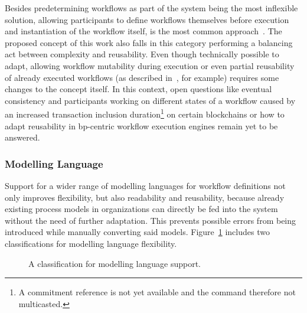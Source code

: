 Besides predetermining workflows as part of the system being the most inflexible solution, allowing participants to define workflows themselves before execution and instantiation of the workflow itself, is the most common approach~\cite{untrusted_bp_execution_using_blockchain,bo_collaboration_between_healthcare_providers_covid_19,lean_architecture_for_blockchain_based_process_execution}. The proposed concept of this work also falls in this category performing a balancing act between complexity and reusability. Even though technically possible to adapt, allowing workflow mutability during execution or even partial reusability of already executed workflows (as described in~\cite{data_driven_choreography_data_reusability_lichtenstein}, for example) requires some changes to the concept itself. In this context, open questions like eventual consistency and participants working on different states of a workflow caused by an increased transaction inclusion duration\footnote{A commitment reference is not yet available and the command therefore not multicasted.} on certain blockchains or how to adapt reusability in \gls{bp}-centric workflow execution engines remain yet to be answered.

\subsubsection{Modelling Language}
\label{sec:evaluation:qualitative_analysis:flexibility_criteria:modelling_language}
Support for a wider range of modelling languages for workflow definitions not only improves flexibility, but also readability and reusability, because already existing process models in organizations can directly be fed into the system without the need of further adaptation. This prevents possible errors from being introduced while manually converting said models. Figure~\ref{fig:evaluation:qualitative_analysis:modelling_language_classes} includes two classifications for modelling language flexibility.

\begin{figure}[h]
    \caption{A classification for modelling language support.}
    \label{fig:evaluation:qualitative_analysis:modelling_language_classes}
\end{figure}

